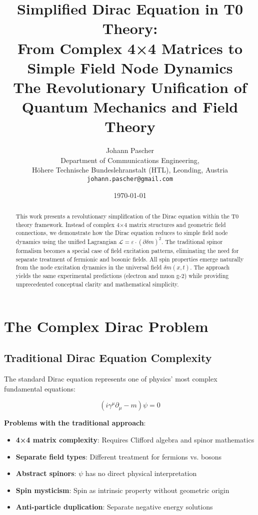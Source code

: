 \documentclass[12pt,a4paper]{article}
\title{Simplified Dirac Equation in T0 Theory: \\
	From Complex 4×4 Matrices to Simple Field Node Dynamics \\
	\large The Revolutionary Unification of Quantum Mechanics and Field Theory}
\author{Johann Pascher\\
	Department of Communications Engineering, \\H\"ohere Technische Bundeslehranstalt (HTL), Leonding, Austria\\
	\texttt{johann.pascher@gmail.com}}
\date{\today}
\newcommand{\Lag}{\mathcal{L}}
\newcommand{\deltam}{\delta m}
\theoremstyle{definition}
\theoremstyle{remark}
\begin{document}
	
	\maketitle
	
	\begin{abstract}
		This work presents a revolutionary simplification of the Dirac equation within the T0 theory framework. Instead of complex 4×4 matrix structures and geometric field connections, we demonstrate how the Dirac equation reduces to simple field node dynamics using the unified Lagrangian $\Lag = \varepsilon \cdot (\partial \deltam)^2$. The traditional spinor formalism becomes a special case of field excitation patterns, eliminating the need for separate treatment of fermionic and bosonic fields. All spin properties emerge naturally from the node excitation dynamics in the universal field $\deltam(x,t)$. The approach yields the same experimental predictions (electron and muon g-2) while providing unprecedented conceptual clarity and mathematical simplicity.
	\end{abstract}
	
	\tableofcontents
	\newpage
	
	\section{The Complex Dirac Problem}
	
	\subsection{Traditional Dirac Equation Complexity}
	
	The standard Dirac equation represents one of physics' most complex fundamental equations:
	
	\begin{equation}
		(i\gamma^{\mu}\partial_{\mu} - m)\psi = 0
		\label{eq:standard_dirac}
	\end{equation}
	
	\textbf{Problems with the traditional approach}:
	\begin{itemize}
		\item \textbf{4×4 matrix complexity}: Requires Clifford algebra and spinor mathematics
		\item \textbf{Separate field types}: Different treatment for fermions vs. bosons
		\item \textbf{Abstract spinors}: $\psi$ has no direct physical interpretation
		\item \textbf{Spin mysticism}: Spin as intrinsic property without geometric origin
		\item \textbf{Anti-particle duplication}: Separate negative energy solutions
	\end{itemize}
	
\end{document}
